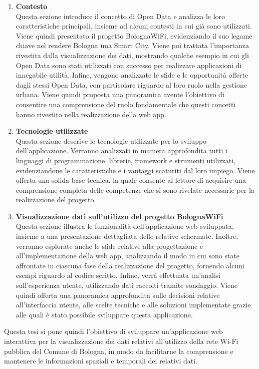 \begin{enumerate}
    \item \textbf{Contesto}\\
    Questa sezione introduce il concetto di Open Data e analizza le loro caratteristiche principali, insieme ad alcuni contesti in cui già sono utilizzati. Viene quindi presentato il progetto BolognaWiFi, evidenziando il suo legame chiave nel rendere Bologna una Smart City. Viene poi trattata l'importanza rivestita dalla visualizzazione dei dati, mostrando qualche esempio in cui gli Open Data sono stati utilizzati con successo per realizzare applicazioni di innegabile utilità. Infine, vengono analizzate le sfide e le opportunità offerte dagli stessi Open Data, con particolare riguardo al loro ruolo nella gestione urbana. Viene quindi proposta una panoramica avente l'obiettivo di consentire una comprensione del ruolo fondamentale che questi concetti hanno rivestito nella realizzazione della web app.
    \item \textbf{Tecnologie utilizzate}\\
    Questa sezione descrive le tecnologie utilizzate per lo sviluppo dell'applicazione. Verranno analizzati in maniera approfondita tutti i linguaggi di programmazione, librerie, framework e strumenti utilizzati, evidenziandone le caratteristiche e i vantaggi scaturiti dal loro impiego. Viene offerta una solida base tecnica, la quale consente al lettore di acquisire una comprensione completa delle competenze che si sono rivelate necessarie per la realizzazione del progetto.
    \item \textbf{Visualizzazione dati sull'utilizzo del progetto BolognaWiFi}\\
    Questa sezione illustra le funzionalità dell'applicazione web sviluppata, insieme a una presentazione dettagliata delle relative schermate. Inoltre, verranno esplorate anche le sfide relative alla progettazione e all'implementazione della web app, analizzando il modo in cui sono state affrontate in ciascuna fase della realizzazione del progetto, fornendo alcuni esempi riguardo al codice scritto. Infine, verrà effettuata un'analisi sull'esperienza utente, utilizzando dati raccolti tramite sondaggio. Viene quindi offerta una panoramica approfondita sulle decisioni relative all'interfaccia utente, alle scelte tecniche e alle soluzioni implementate grazie alle quali è stato possibile sviluppare questa applicazione.
\end{enumerate}


Questa tesi si pone quindi l'obiettivo di sviluppare un'applicazione web interattiva per la visualizzazione dei dati relativi all'utilizzo della rete Wi-Fi pubblica del Comune di Bologna, in modo da facilitarne la comprensione e mantenere le informazioni spaziali e temporali dei relativi dati.

\clearpage{\pagestyle{empty}\cleardoublepage}